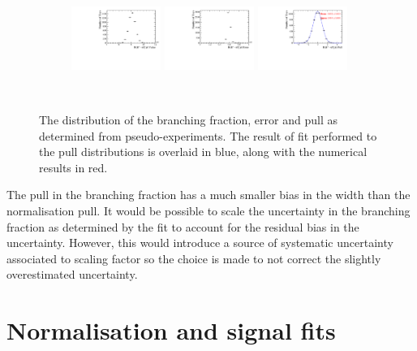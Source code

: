 \begin{figure}[!h]
   \centering
   \begin{subfigure}[t]{1.0\textwidth}
      \includegraphics[width=0.32\textwidth]{figs/B2DsKK/Branching_Fraction_val.pdf}
      \includegraphics[width=0.32\textwidth]{figs/B2DsKK/Branching_Fraction_err.pdf}
      \includegraphics[width=0.32\textwidth]{figs/B2DsKK/Branching_Fraction_pul.pdf}
   \end{subfigure}\\
   \caption{The distribution of the branching fraction, error and pull as determined from pseudo-experiments. The result of fit performed to the pull distributions is overlaid in blue, along with the numerical results in red.}
   \label{fig:B2DsKK_BR_Pulls}
\end{figure}

The pull in the branching fraction has a much smaller bias in the width than the normalisation pull.
It would be possible to scale the uncertainty in the branching fraction as determined by the fit to account for the residual bias in the uncertainty. However, this would introduce a source of systematic uncertainty associated to scaling factor so the choice is made to not correct the slightly overestimated uncertainty. 

\section{Normalisation and signal fits}

